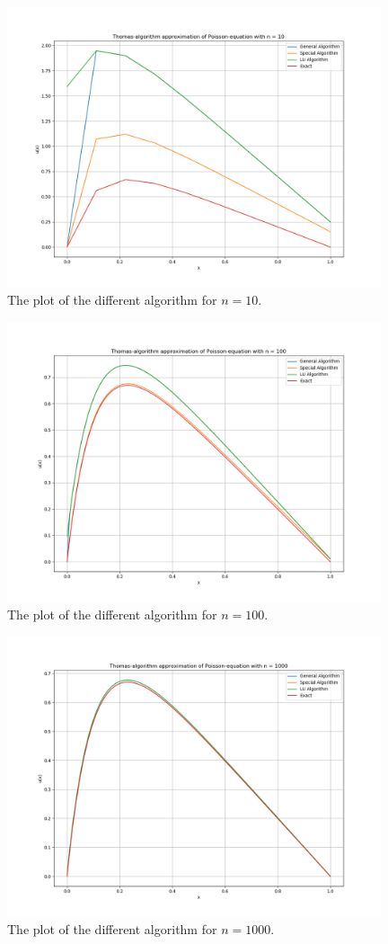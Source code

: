 \documentclass{article}
\begin{document}
\begin{figure}[ht]
	\centering
	\includegraphics[width = 11cm]{program/data10.png}
	\caption{The plot of the different algorithm for $n = 10$. }
  \label{fig:data10png}
\end{figure}

\begin{figure}[ht]
	\centering
	\includegraphics[width = 11cm]{program/data100.png}
	\caption{The plot of the different algorithm for $n = 100$. }
  \label{fig:data100png}
\end{figure}

\begin{figure}[ht]
	\centering
	\includegraphics[width = 11cm]{program/data1000.png}
	\caption{The plot of the different algorithm for $n = 1000$. }
  \label{fig:data1000png}
\end{figure}
\end{document}
